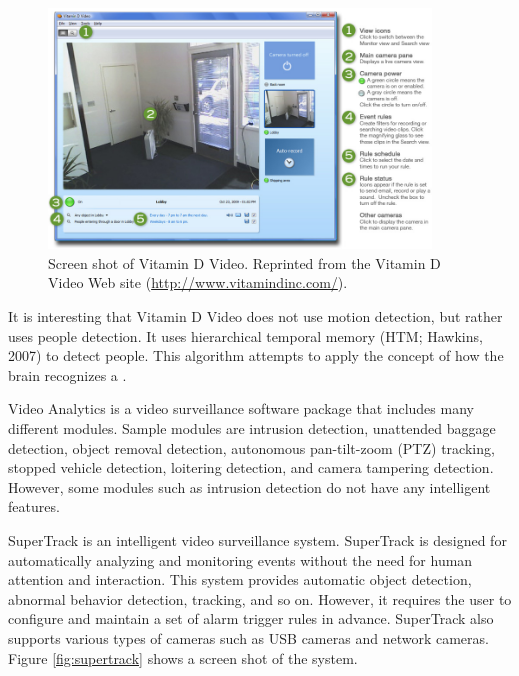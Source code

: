 \begin{figure}[t]
  \begin{center}
    \includegraphics[width=4in]{figures/vitamind.jpg}
    \caption[Screen shot of Vitamin D Video.]{\small Screen shot of
      Vitamin D Video. Reprinted from the Vitamin D Video Web site
      (\url{http://www.vitamindinc.com/}).}
    \label{fig:vitamind}
  \end{center}
\end{figure}

It is interesting that Vitamin D Video does not use motion detection,
but rather uses people detection. It uses hierarchical temporal memory
(HTM; Hawkins, 2007)\nocite{jeff07htm} to detect people. This
algorithm attempts to apply the concept of how the brain recognizes a
\DIFdelbegin {}\DIFdelend \DIFaddbegin {}\DIFaddend .

Video Analytics  is a video surveillance software
package that includes many different modules.  Sample modules are
intrusion detection, unattended baggage detection, object removal
detection, autonomous pan-tilt-zoom (PTZ) tracking, stopped vehicle
detection, loitering detection, and camera tampering
detection. However, some modules such as intrusion detection do not
have any intelligent features.

SuperTrack  is an intelligent video surveillance
system. SuperTrack is designed for automatically analyzing and
monitoring events without the need for human attention and
interaction. This system provides automatic object detection, abnormal
behavior detection, tracking, and so on. However, it requires the user
to configure and maintain a set of alarm trigger rules in
advance. SuperTrack also supports various types of cameras such as USB
cameras and network cameras.  Figure \ref{fig:supertrack} shows a
screen shot of the system.

